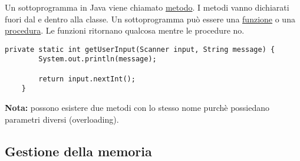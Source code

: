 \documentclass[../main.tex]{subfiles}
\begin{document}
Un sottoprogramma in Java viene chiamato \underline{metodo}. I metodi vanno dichiarati fuori dal  e dentro alla classe.
Un sottoprogramma può essere una \underline{funzione} o una \underline{procedura}. Le funzioni ritornano qualcosa mentre le procedure no.

\begin{lstlisting}[style=java]
    private static int getUserInput(Scanner input, String message) {
        System.out.println(message);

        return input.nextInt();
    }
\end{lstlisting}
\textbf{Nota:} possono esistere due metodi con lo stesso nome purchè possiedano parametri diversi (overloading).

\vspace{1.5cm}
\subsection{Gestione della memoria}
\end{document}
